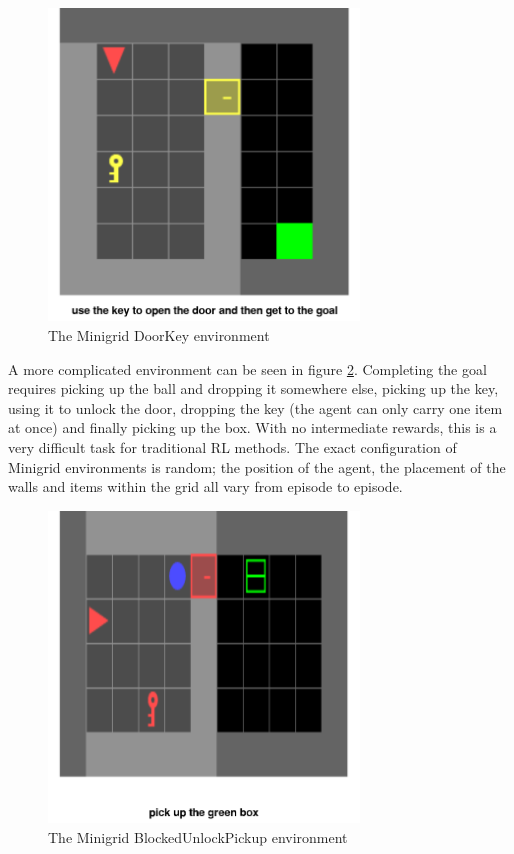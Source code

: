 \documentclass[conference]{IEEEtran}
\begin{document}
\begin{figure}[h]
\centerline{\includegraphics[width=3.25in]{figure/doorkeyenv.png}}
\caption{The Minigrid DoorKey environment}
\label{doorkeyenv}
\end{figure}

A more complicated environment can be seen in figure \ref{blockedunlockpickupenv}. Completing the goal requires picking up the ball and dropping it somewhere else, picking up the key, using it to unlock the door, dropping the key (the agent can only carry one item at once) and finally picking up the box. With no intermediate rewards, this is a very difficult task for traditional RL methods. The exact configuration of Minigrid environments is random; the position of the agent, the placement of the walls and items within the grid all vary from episode to episode.

\begin{figure}[h]
\centerline{\includegraphics[width=3.25in]{figure/blockedunlockpickupenv.png}}
\caption{The Minigrid BlockedUnlockPickup environment}
\label{blockedunlockpickupenv}
\end{figure}
\end{document}
